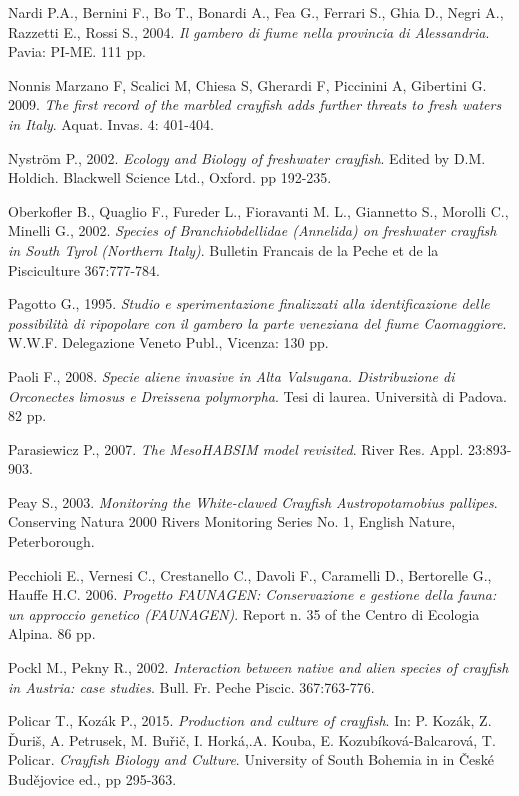 \documentclass[11pt,a4paper,italian,twoside,openany]{memoir}
\begin{document}
\begin{thebibliography}{9}
 Nardi P.A., Bernini F., Bo T., Bonardi A., Fea G., Ferrari S., Ghia D., Negri A., Razzetti E., Rossi S., 2004. \emph{Il gambero di fiume nella provincia di Alessandria}. Pavia: PI-ME. 111 pp.

 Nonnis Marzano F, Scalici M, Chiesa S, Gherardi F, Piccinini A, Gibertini G. 2009. \emph{The first record of the marbled crayfish adds further threats to fresh waters in Italy}. Aquat. Invas. 4: 401-404.

 Nyström P., 2002. \emph{Ecology and Biology of freshwater crayfish}. Edited by D.M. Holdich. Blackwell Science Ltd., Oxford. pp 192-235.

 Oberkofler B., Quaglio F., Fureder L., Fioravanti M. L., Giannetto S., Morolli C., Minelli G., 2002. \emph{Species of Branchiobdellidae (Annelida) on freshwater crayfish in South Tyrol (Northern Italy)}. Bulletin Francais de la Peche et de la Pisciculture 367:777-784.

 Pagotto G., 1995. \emph{Studio e sperimentazione finalizzati alla identificazione delle possibilità di ripopolare con il gambero la parte veneziana del fiume Caomaggiore}. W.W.F. Delegazione Veneto Publ., Vicenza: 130 pp.

 Paoli F., 2008. \emph{Specie aliene invasive in Alta Valsugana. Distribuzione di Orconectes limosus e Dreissena polymorpha}. Tesi di laurea. Università di Padova. 82 pp.

 Parasiewicz P., 2007. \emph{The MesoHABSIM model revisited}. River Res. Appl. 23:893-903.

 Peay S., 2003. \emph{Monitoring the White-clawed Crayfish Austropotamobius pallipes}. Conserving Natura 2000 Rivers Monitoring Series No. 1, English Nature, Peterborough.

 Pecchioli E., Vernesi C., Crestanello C., Davoli F., Caramelli D., Bertorelle G., Hauffe H.C. 2006. \emph{Progetto FAUNAGEN: Conservazione e gestione della fauna: un approccio genetico (FAUNAGEN)}. Report n. 35 of the Centro di Ecologia Alpina. 86 pp.

 Pockl M., Pekny R., 2002. \emph{Interaction between native and alien species of crayfish in Austria: case studies}. Bull. Fr. Peche Piscic. 367:763-776.

 Policar T., Kozák P., 2015. \emph{Production and culture of crayfish}. In: P. Kozák, Z. Ďuriš, A. Petrusek, M. Buřič, I. Horká,.A. Kouba, E. Kozubíková-Balcarová, T. Policar. \emph{Crayfish Biology and Culture}. University of South Bohemia in in České Budějovice ed., pp 295-363.


\end{thebibliography}
\end{document}
